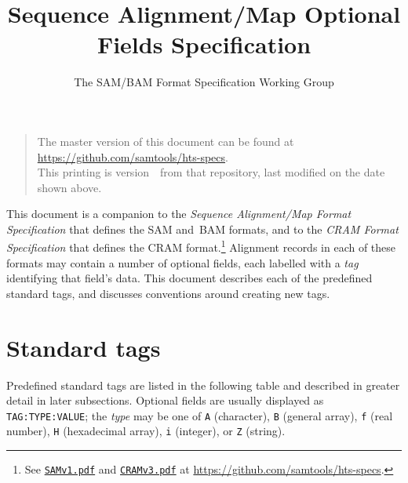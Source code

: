 \documentclass[10pt]{article}
\begin{document}

\title{Sequence Alignment/Map Optional Fields Specification}
\author{The SAM/BAM Format Specification Working Group}
\date{\headdate}
\maketitle
\begin{quote}\small
The master version of this document can be found at
\url{https://github.com/samtools/hts-specs}.\\
This printing is version~\commitdesc\ from that repository,
last modified on the date shown above.
\end{quote}
\vspace*{1em}

\noindent
This document is a companion to the {\sl Sequence Alignment/Map Format
Specification} that defines the SAM and~BAM formats, and to the {\sl CRAM
Format Specification} that defines the CRAM format.\footnote{See
\href{http://samtools.github.io/hts-specs/SAMv1.pdf}{\tt SAMv1.pdf} and
\href{http://samtools.github.io/hts-specs/CRAMv3.pdf}{\tt CRAMv3.pdf}
at \url{https://github.com/samtools/hts-specs}.}
Alignment records in each of these formats may contain a number of optional
fields, each labelled with a {\it tag\/} identifying that field's data.
This document describes each of the predefined standard tags, and discusses
conventions around creating new tags.

\section{Standard tags}

Predefined standard tags are listed in the following table and described
in greater detail in later subsections.
Optional fields are usually displayed as {\tt TAG:TYPE:VALUE}; the {\it type\/}
may be one of
{\tt A} (character),
{\tt B} (general array),
{\tt f} (real number),
{\tt H} (hexadecimal array),
{\tt i} (integer),
or
{\tt Z} (string).
\end{document}
